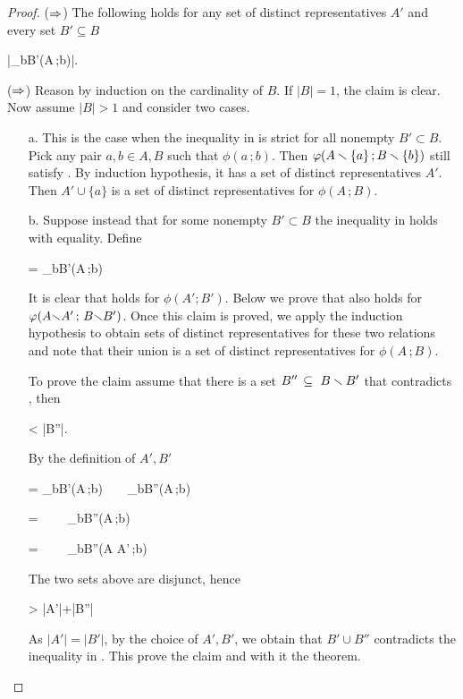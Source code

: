 \documentclass[scombinatorics.tex]{subfiles}
\begin{document}
\begin{proof}
  ($\Rightarrow$)
  The following holds for any set of distinct representatives $A'$ and every set $B'\subseteq B$  

  {\subseteq}
  {\bigg|\bigcup_{b\in B'}\phi(A\,;b)\bigg|.}

  ($\Rightarrow$)
  Reason by induction on the cardinality of $B$.
  If $|B|=1$, the claim is clear.
  Now assume $|B|>1$ and consider two cases.

  \begin{itemize}
    \item[a.]
    This is the case when the inequality in  is strict for all nonempty $B'\subset B$. 
    Pick any pair $a,b\in A,B$ such that $\phi(a\,;b)$. 
    Then $\varphi(A\smallsetminus\{a\}\,; B\smallsetminus\{b\})$ still satisfy .
    By induction hypothesis, it has a set of distinct representatives $A'$.
    Then $A'\cup\{a\}$ is a set of distinct representatives for $\phi(A\,;B)$.

    
    \item[b.]
    Suppose instead that for some nonempty $B'\subset B$ the inequality in  holds with equality.
    Define

    {=}
    {\bigcup_{b\in B'}\phi(A\,;b)}
    
    It is clear that  holds for $\phi(A';B')$.
    Below we prove that  also holds for $\varphi(A{\smallsetminus} A'\,;\,{B\smallsetminus} B')$.
    Once this claim is proved, we apply the induction hypothesis to obtain sets of distinct representatives for these two relations and note that their union is a set of distinct representatives for $\phi(A\,;B)$.

    To prove the claim assume that there is a set $B''\,\subseteq\ B\smallsetminus B'$ that contradicts , then

    {<}
    {|B''|.}

    By the definition of $A',B'$

    {=}
    {\bigcup_{b\in B'}\phi(A\,;b)\ \ \cup\ \ \bigcup_{b\in B''}\phi(A\,;b)}

    \ceq{}
    {=}
    {\ \ \cup\ \ \bigcup_{b\in B''}\phi(A\,;b)}

    \ceq{}
    {=}
    {\ \ \cup\ \ \bigcup_{b\in B''}\phi(A{\sm} A'\,;b)}

    The two sets above are disjunct, hence 

    {>}
    {|A'|+|B''|}

    As $|A'|=|B'|$, by the choice of $A',B'$, we obtain that $B'\cup B''$ contradicts the inequality in .
    This prove the claim and with it the theorem.
  \end{itemize}\vspace*{-4ex}
\end{proof}
\end{document}
